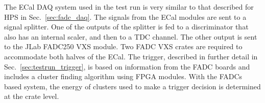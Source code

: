 The ECal DAQ system used in the test run is very similar to that described for HPS in Sec.~\ref{sec:fadc_daq}. 
The signals from the ECal modules are sent to a signal splitter. One of the outputs of the splitter is fed to a 
discriminator that also has an internal scaler, and then to a TDC channel. The other output is sent to the 
JLab FADC250 VXS module.
Two FADC VXS crates are required to 
accommodate both halves of the ECal. The trigger, described in further detail in 
Sec.~\ref{sec:testrun_trigger}, is based on information from the FADC boards and includes a cluster 
finding algorithm using FPGA modules. With the FADCs based system, the energy of clusters used to 
make a trigger decision is determined at the crate level. 
